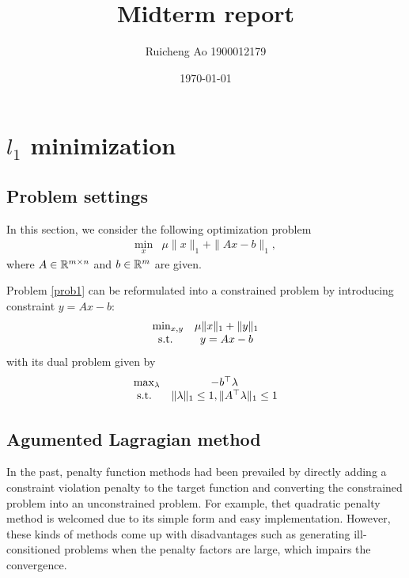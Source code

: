 \documentclass{article}
\title{Midterm report}
\date{\today}
\author{Ruicheng Ao 1900012179}
\begin{document}
\maketitle
\tableofcontents
\section{$l_1$ minimization}
\subsection{Problem settings}
In this section, we consider the following optimization problem
\begin{equation}\label{prob1}
\begin{array}{cc}
\min_x & \mu\|x\|_1+\|Ax-b\|_1,
\end{array}
\end{equation}
where $A\in\mathbb R^{m\times n}$ and $b\in\mathbb R^m$ are given.

Problem \eqref{prob1} can be reformulated into a constrained problem by introducing constraint $y=Ax-b$:
\begin{equation}\label{prob2}
\begin{array}{cc}
\min_{x,y} & \mu\|x\|_1+\|y\|_1 \\
\text{s.t. } & y=Ax-b 
\end{array}
\end{equation}
with its dual problem given by 
\begin{equation}\label{prob3}
\begin{array}{cc}
	\max_{\lambda} &-b^\top\lambda \\
\text{s.t. } & \|\lambda\|_1\le1,\|A^\top\lambda\|_1\le1
\end{array}
\end{equation}
\subsection{Agumented Lagragian method}
In the past, penalty function methods had been prevailed by directly adding a constraint violation penalty to the target function \cite[section 10]{boyd2004convex} and converting the constrained problem into an unconstrained problem. For example, thet quadratic penalty method is welcomed due to its simple form and easy implementation. However, these kinds of methods come up with disadvantages such as generating ill-consitioned problems when the penalty factors are large, which impairs the convergence.
\end{document}
